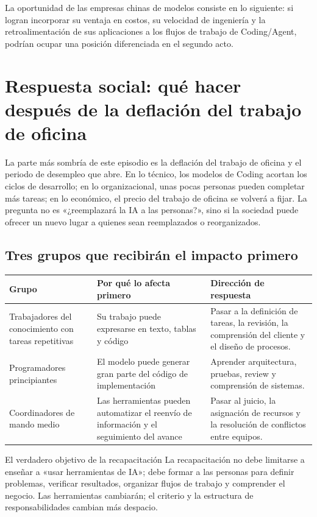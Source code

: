 \documentclass[a4paper]{article}
\begin{document}
La oportunidad de las empresas chinas de modelos consiste en lo siguiente: si logran incorporar su ventaja en costos, su velocidad de ingeniería y la retroalimentación de sus aplicaciones a los flujos de trabajo de Coding/Agent, podrían ocupar una posición diferenciada en el segundo acto.
\section{Respuesta social: qué hacer después de la deflación del trabajo de oficina}

La parte más sombría de este episodio es la deflación del trabajo de oficina y el periodo de desempleo que abre. En lo técnico, los modelos de Coding acortan los ciclos de desarrollo; en lo organizacional, unas pocas personas pueden completar más tareas; en lo económico, el precio del trabajo de oficina se volverá a fijar. La pregunta no es «¿reemplazará la IA a las personas?», sino si la sociedad puede ofrecer un nuevo lugar a quienes sean reemplazados o reorganizados.

\subsection{Tres grupos que recibirán el impacto primero}

\noindent\begin{tabularx}{\textwidth}{p{}p{}X}
\toprule
Grupo & Por qué lo afecta primero & Dirección de respuesta \\
\midrule
Trabajadores del conocimiento con tareas repetitivas & Su trabajo puede expresarse en texto, tablas y código & Pasar a la definición de tareas, la revisión, la comprensión del cliente y el diseño de procesos. \\
Programadores principiantes & El modelo puede generar gran parte del código de implementación & Aprender arquitectura, pruebas, review y comprensión de sistemas. \\
Coordinadores de mando medio & Las herramientas pueden automatizar el reenvío de información y el seguimiento del avance & Pasar al juicio, la asignación de recursos y la resolución de conflictos entre equipos. \\
\bottomrule
\end{tabularx}

\begin{knowledgebox}{El verdadero objetivo de la recapacitación}
La recapacitación no debe limitarse a enseñar a «usar herramientas de IA»; debe formar a las personas para definir problemas, verificar resultados, organizar flujos de trabajo y comprender el negocio. Las herramientas cambiarán; el criterio y la estructura de responsabilidades cambian más despacio.
\end{knowledgebox}
\end{document}
